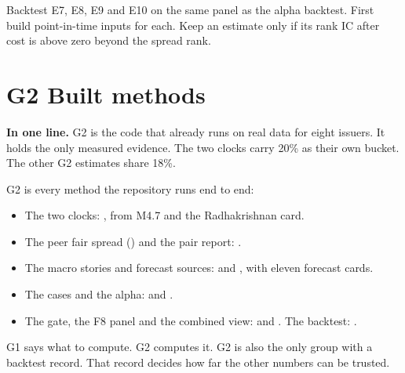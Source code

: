 Backtest E7, E8, E9 and E10 on the same panel as the alpha backtest. First build point-in-time inputs for each. Keep an estimate only if its rank IC after cost is above zero beyond the spread rank.

\newpage
\section*{\textcolor{gB}{G2} Built methods}

\begin{notebox}
\textbf{In one line.} G2 is the code that already runs on real data for eight issuers. It holds the only measured evidence. The two clocks carry 20\% as their own bucket. The other G2 estimates share 18\%.
\end{notebox}

G2 is every method the repository runs end to end:
\begin{itemize}
\item The two clocks: , from M4.7 and the Radhakrishnan card.
\item The peer fair spread () and the pair report: .
\item The macro stories and forecast sources:  and , with eleven forecast cards.
\item The cases and the alpha:  and .
\item The gate, the F8 panel and the combined view:  and . The backtest: .
\end{itemize}

G1 says what to compute. G2 computes it. G2 is also the only group with a backtest record. That record decides how far the other numbers can be trusted.

